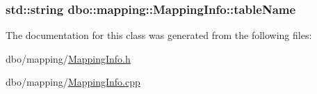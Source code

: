 \hypertarget{classdbo_1_1mapping_1_1_mapping_info_acbde5a13cfb34bfc295618d04f5e1b2f}{
\subsubsection[{table\+Name}]{\setlength{\rightskip}{0pt plus 5cm}std\+::string dbo\+::mapping\+::\+Mapping\+Info\+::table\+Name}}\label{classdbo_1_1mapping_1_1_mapping_info_acbde5a13cfb34bfc295618d04f5e1b2f}


The documentation for this class was generated from the following files\+:\begin{DoxyCompactItemize}
\item 
dbo/mapping/\hyperlink{_mapping_info_8h}{Mapping\+Info.\+h}\item 
dbo/mapping/\hyperlink{_mapping_info_8cpp}{Mapping\+Info.\+cpp}\end{DoxyCompactItemize}
